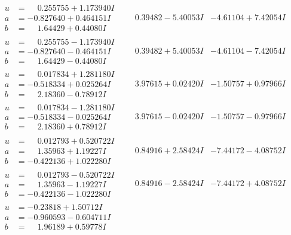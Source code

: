 \documentclass[1p]{elsarticle_modified}
\theoremstyle{definition}
\begin{document}
$$\begin{array}{c|c|c}
\begin{aligned}
u &= \phantom{-}0.255755 + 1.173940 I \\
a &= -0.827640 + 0.464151 I \\
b &= \phantom{-}1.64429 + 0.44080 I\end{aligned}
 & \phantom{-}0.39482 - 5.40053 I & -4.61104 + 7.42054 I \\ \hline\begin{aligned}
u &= \phantom{-}0.255755 - 1.173940 I \\
a &= -0.827640 - 0.464151 I \\
b &= \phantom{-}1.64429 - 0.44080 I\end{aligned}
 & \phantom{-}0.39482 + 5.40053 I & -4.61104 - 7.42054 I \\ \hline\begin{aligned}
u &= \phantom{-}0.017834 + 1.281180 I \\
a &= -0.518334 + 0.025264 I \\
b &= \phantom{-}2.18360 - 0.78912 I\end{aligned}
 & \phantom{-}3.97615 + 0.02420 I & -1.50757 + 0.97966 I \\ \hline\begin{aligned}
u &= \phantom{-}0.017834 - 1.281180 I \\
a &= -0.518334 - 0.025264 I \\
b &= \phantom{-}2.18360 + 0.78912 I\end{aligned}
 & \phantom{-}3.97615 - 0.02420 I & -1.50757 - 0.97966 I \\ \hline\begin{aligned}
u &= \phantom{-}0.012793 + 0.520722 I \\
a &= \phantom{-}1.35963 + 1.19227 I \\
b &= -0.422136 + 1.022280 I\end{aligned}
 & \phantom{-}0.84916 + 2.58424 I & -7.44172 - 4.08752 I \\ \hline\begin{aligned}
u &= \phantom{-}0.012793 - 0.520722 I \\
a &= \phantom{-}1.35963 - 1.19227 I \\
b &= -0.422136 - 1.022280 I\end{aligned}
 & \phantom{-}0.84916 - 2.58424 I & -7.44172 + 4.08752 I \\ \hline\begin{aligned}
u &= -0.23818 + 1.50712 I \\
a &= -0.960593 - 0.604711 I \\
b &= \phantom{-}1.96189 + 0.59778 I\end{aligned}

\end{array}$$
\end{document}
